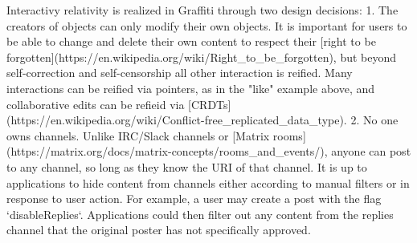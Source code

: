 Interactivy relativity is realized in Graffiti through two design decisions:
1. The creators of objects can only modify their own objects. It is important for
   users to be able to change and delete their own content to respect their
   [right to be forgotten](https://en.wikipedia.org/wiki/Right_to_be_forgotten),
   but beyond self-correction and self-censorship all other interaction is reified.
   Many interactions can be reified via pointers, as in the "like" example above, and collaborative
   edits can be refieid via [CRDTs](https://en.wikipedia.org/wiki/Conflict-free_replicated_data_type).
2. No one owns channels. Unlike IRC/Slack channels or [Matrix rooms](https://matrix.org/docs/matrix-concepts/rooms_and_events/),
   anyone can post to any channel, so long as they know the URI of that channel.
   It is up to applications to hide content from channels either according to manual
   filters or in response to user action.
   For example, a user may create a post with the flag `disableReplies`.
   Applications could then filter out any content from the replies channel
   that the original poster has not specifically approved.
